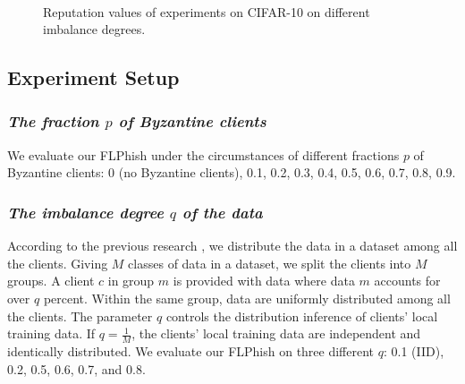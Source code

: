 \documentclass[journal]{IEEEtran}
\begin{document}
\begin{figure}[!htp]
  \centering
  \\
  \caption{Reputation values of experiments on CIFAR-10 on different imbalance degrees.}
  \label{fig_exp_cifar_reputation}
  \vspace{0.2in}
\end{figure}

\subsection{Experiment Setup}


  \subsubsection{{\textit{The fraction {$p$} of Byzantine clients}}} We evaluate our FLPhish under the circumstances of different fractions $p$ of Byzantine clients: 0 (no Byzantine clients), 0.1, 0.2, 0.3, 0.4, 0.5, 0.6, 0.7, 0.8, 0.9.
  \subsubsection{{\textit{The imbalance degree {$q$} of the data}}} According to the previous research \cite{ref_06_model}, we distribute the data in a dataset among all the clients. Giving $M$ classes of data in a dataset, we split the clients into $M$ groups. A client $c$ in group $m$ is provided with data where data $m$ accounts for over $q$ percent. Within the same group, data are uniformly distributed among all the clients. The parameter $q$ controls the distribution inference of clients' local training data. If $q=\frac{1}{M}$, the clients' local training data are independent and identically distributed. We evaluate our FLPhish on three different $q$: 0.1 (IID), 0.2, 0.5, 0.6, 0.7, and 0.8.
\end{document}
